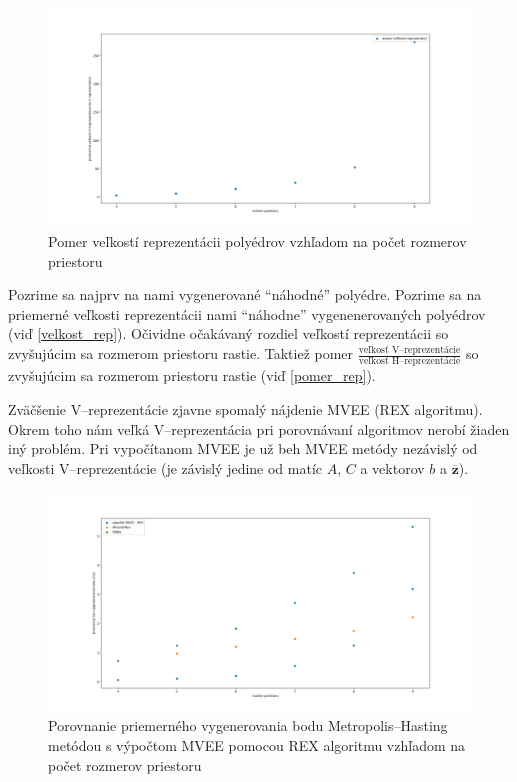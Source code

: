 \begin{figure} 
	\includegraphics[width=\linewidth]{images/pomer_rep.png}
	\caption{Pomer veľkostí reprezentácii polyédrov vzhľadom na počet rozmerov priestoru}
	\label{fig:pomer_rep}
\end{figure}

Pozrime sa najprv na nami vygenerované ``náhodné'' polyédre. Pozrime sa na priemerné veľkosti reprezentácii nami ``náhodne'' vygenenerovaných polyédrov (viď \ref{velkost_rep}). Očividne očakávaný rozdiel veľkostí reprezentácii so zvyšujúcim sa rozmerom priestoru rastie. Taktiež pomer $\frac{\text{veľkosť V--reprezentácie}}{\text{veľkosť H--reprezentácie}}$ so zvyšujúcim sa rozmerom priestoru rastie (viď \ref{pomer_rep}).

Zväčšenie V--reprezentácie zjavne spomalý nájdenie MVEE (REX algoritmu). Okrem toho nám veľká V--reprezentácia pri porovnávaní algoritmov nerobí žiaden iný problém. Pri vypočítanom MVEE je už beh MVEE metódy nezávislý od veľkosti V--reprezentácie (je závislý jedine od matíc $A$, $C$ a vektorov $b$ a $\mathbf{\overline z}$).\\

\begin{figure} 
	\includegraphics[width=\linewidth]{images/mh_rex.png}
	\caption{Porovnanie priemerného vygenerovania bodu Metropolis--Hasting metódou s výpočtom MVEE pomocou REX algoritmu vzhľadom na počet rozmerov priestoru}
	\label{fig:mh_rex}
\end{figure}

